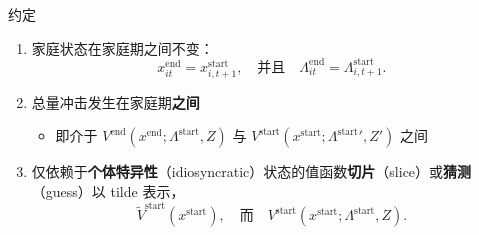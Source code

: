 \documentclass[10pt,aspectratio=169]{beamer}
\newcommand{\Vstart}{V^{\mathrm{start}}}
\newcommand{\Vend}{V^{\mathrm{end}}}
\newcommand{\Vstarttil}{\widetilde{V}^{\mathrm{start}}}
\newcommand{\Lstart}{\Lambda^{\mathrm{start}}}
\newcommand{\Lend}{\Lambda^{\mathrm{end}}}
\newcommand{\xstart}{x^{\mathrm{start}}}
\newcommand{\xend}{x^{\mathrm{end}}}
\begin{document}
\begin{frame}{约定}
  \begin{enumerate}
    \item 家庭状态在家庭期之间不变：
    \[
      \xend_{it} = \xstart_{i,t+1},\quad\text{并且}\quad\Lend_{it} = \Lstart_{i,t+1}.
    \]
    \item 总量冲击发生在家庭期\textbf{之间}
    \begin{itemize}
      \item 即介于 $\Vend(\xend; \Lstart, Z)$ 与 $\Vstart(\xstart; \Lstart{}', Z')$ 之间
    \end{itemize}
    \item 仅依赖于\textbf{个体特异性}（idiosyncratic）状态的值函数\textbf{切片}（slice）或\textbf{猜测}（guess）以 tilde 表示，
    \[
      \Vstarttil(\xstart), \quad\text{而}\quad \Vstart(\xstart; \Lstart, Z).
    \]
  \end{enumerate}
\end{frame}
\end{document}
